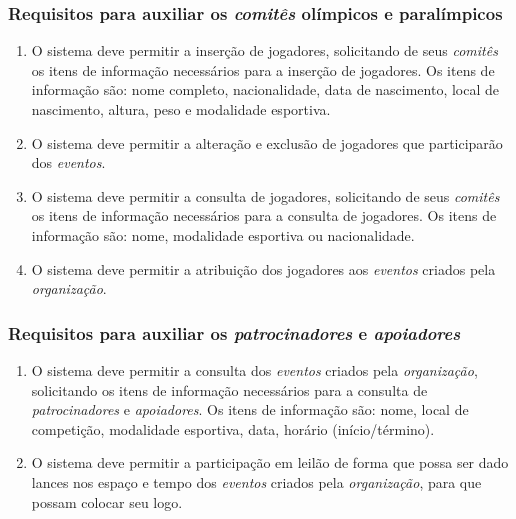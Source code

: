 \documentclass[
10pt, %
a4paper, %
oneside, %
headinclude,footinclude, %
BCOR5mm, %
]{scrartcl}
\begin{document}
\subsubsection{Requisitos para auxiliar os \textit{comitês} olímpicos e paralímpicos}
\begin{enumerate}[noitemsep]
	\item O sistema deve permitir a inserção de jogadores, solicitando de seus \textit{comitês} os itens de informação necessários para a inserção de jogadores. Os itens de informação são: nome completo, nacionalidade, data de nascimento, local de nascimento, altura, peso e modalidade esportiva.
	\item O sistema deve permitir a alteração e exclusão de jogadores que participarão dos \textit{eventos}.
	\item O sistema deve permitir a consulta de jogadores, solicitando de seus \textit{comitês} os itens de informação necessários para a consulta de jogadores. Os itens de informação são: nome, modalidade esportiva ou nacionalidade.
	\item O sistema deve permitir a atribuição dos jogadores aos \textit{eventos} criados pela \textit{organização}.
\end{enumerate}
\subsubsection{Requisitos para auxiliar os \textit{patrocinadores} e \textit{apoiadores}}
\begin{enumerate}[noitemsep]
	\item O sistema deve permitir a consulta dos \textit{eventos} criados pela \textit{organização}, solicitando os itens de informação necessários para a consulta de \textit{patrocinadores} e \textit{apoiadores}. Os itens de informação são: nome, local de competição, modalidade esportiva, data, horário (início/término).
	\item O sistema deve permitir a participação em leilão de forma que possa ser dado lances nos espaço e tempo dos \textit{eventos} criados pela \textit{organização}, para que possam colocar seu logo.
\end{enumerate}
\end{document}
